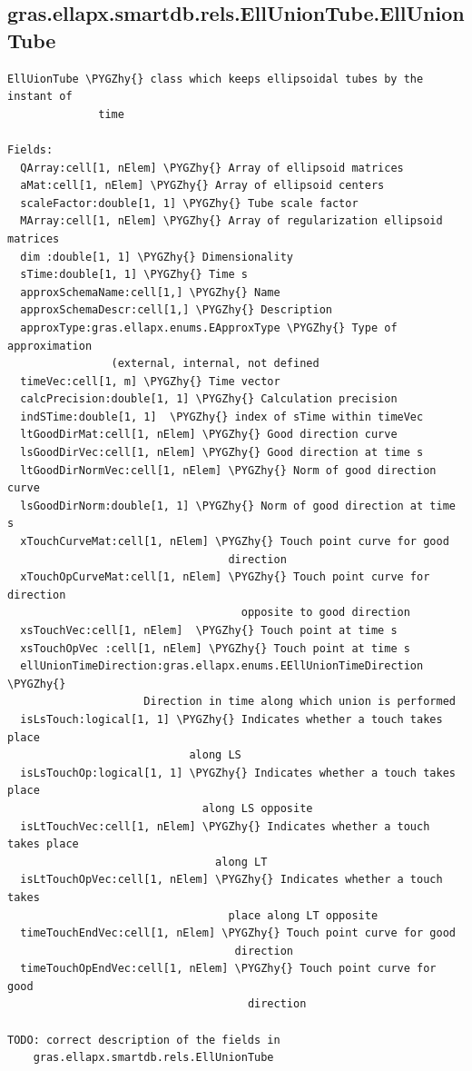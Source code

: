 \documentclass[letterpaper,10pt,english]{sphinxmanual}
\def\PYGZhy{\char`\-}
\begin{document}
\subsection{gras.ellapx.smartdb.rels.EllUnionTube.EllUnionTube}
\label{chap_functions:gras-ellapx-smartdb-rels-elluniontube-elluniontube}
\begin{Verbatim}[commandchars=\\\{\}]
EllUionTube \PYGZhy{} class which keeps ellipsoidal tubes by the instant of
              time

Fields:
  QArray:cell[1, nElem] \PYGZhy{} Array of ellipsoid matrices
  aMat:cell[1, nElem] \PYGZhy{} Array of ellipsoid centers
  scaleFactor:double[1, 1] \PYGZhy{} Tube scale factor
  MArray:cell[1, nElem] \PYGZhy{} Array of regularization ellipsoid matrices
  dim :double[1, 1] \PYGZhy{} Dimensionality
  sTime:double[1, 1] \PYGZhy{} Time s
  approxSchemaName:cell[1,] \PYGZhy{} Name
  approxSchemaDescr:cell[1,] \PYGZhy{} Description
  approxType:gras.ellapx.enums.EApproxType \PYGZhy{} Type of approximation
                (external, internal, not defined
  timeVec:cell[1, m] \PYGZhy{} Time vector
  calcPrecision:double[1, 1] \PYGZhy{} Calculation precision
  indSTime:double[1, 1]  \PYGZhy{} index of sTime within timeVec
  ltGoodDirMat:cell[1, nElem] \PYGZhy{} Good direction curve
  lsGoodDirVec:cell[1, nElem] \PYGZhy{} Good direction at time s
  ltGoodDirNormVec:cell[1, nElem] \PYGZhy{} Norm of good direction curve
  lsGoodDirNorm:double[1, 1] \PYGZhy{} Norm of good direction at time s
  xTouchCurveMat:cell[1, nElem] \PYGZhy{} Touch point curve for good
                                  direction
  xTouchOpCurveMat:cell[1, nElem] \PYGZhy{} Touch point curve for direction
                                    opposite to good direction
  xsTouchVec:cell[1, nElem]  \PYGZhy{} Touch point at time s
  xsTouchOpVec :cell[1, nElem] \PYGZhy{} Touch point at time s
  ellUnionTimeDirection:gras.ellapx.enums.EEllUnionTimeDirection \PYGZhy{}
                     Direction in time along which union is performed
  isLsTouch:logical[1, 1] \PYGZhy{} Indicates whether a touch takes place
                            along LS
  isLsTouchOp:logical[1, 1] \PYGZhy{} Indicates whether a touch takes place
                              along LS opposite
  isLtTouchVec:cell[1, nElem] \PYGZhy{} Indicates whether a touch takes place
                                along LT
  isLtTouchOpVec:cell[1, nElem] \PYGZhy{} Indicates whether a touch takes
                                  place along LT opposite
  timeTouchEndVec:cell[1, nElem] \PYGZhy{} Touch point curve for good
                                   direction
  timeTouchOpEndVec:cell[1, nElem] \PYGZhy{} Touch point curve for good
                                     direction

TODO: correct description of the fields in
    gras.ellapx.smartdb.rels.EllUnionTube
\end{Verbatim}
\end{document}
